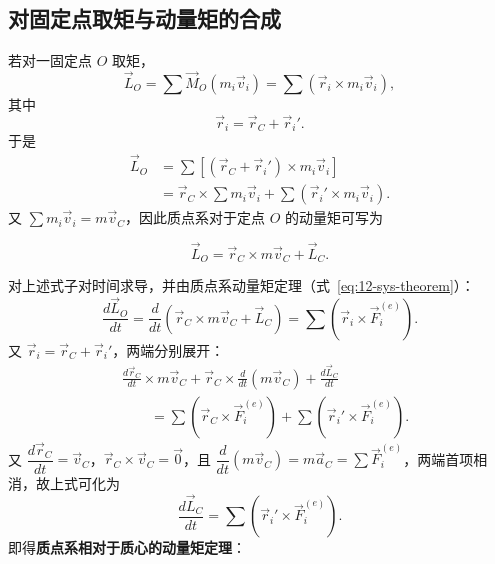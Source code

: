 \subsection{对固定点取矩与动量矩的合成}

若对一固定点 $O$ 取矩，
\begin{equation}\label{eq:12-lo-fixed}
  \vec{L}_O=\sum\vec{M}_O(m_i\vec{v}_i)=\sum\left(\vec{r}_i\times m_i\vec{v}_i\right),
\end{equation}
其中
\begin{equation}\label{eq:12-ri-decomp}
  \vec{r}_i=\vec{r}_C+\vec{r}_i'.
\end{equation}
于是
\begin{equation}\label{eq:12-lo-expand}
\begin{aligned}
  \vec{L}_O
  &=\sum\left[\left(\vec{r}_C+\vec{r}_i'\right)\times m_i\vec{v}_i\right]\\
  &=\vec{r}_C\times\sum m_i\vec{v}_i+\sum\left(\vec{r}_i'\times m_i\vec{v}_i\right).
\end{aligned}
\end{equation}
又 $\sum m_i\vec{v}_i=m\vec{v}_C$，因此质点系对于定点 $O$ 的动量矩可写为

\begin{proposition}[对固定点与对质心动量矩的合成关系]
\begin{equation}\label{eq:12-lo-compose}
  \vec{L}_O=\vec{r}_C\times m\vec{v}_C+\vec{L}_C.
\end{equation}
\end{proposition}


对上述式子对时间求导，并由质点系动量矩定理（式~\eqref{eq:12-sys-theorem}）：
\begin{equation}\label{eq:12-dlo-total}
  \frac{d\vec{L}_O}{dt}
  =\frac{d}{dt}\left(\vec{r}_C\times m\vec{v}_C+\vec{L}_C\right)
  =\sum\left(\vec{r}_i\times\vec{F}_i^{(e)}\right).
\end{equation}
又 $\vec{r}_i=\vec{r}_C+\vec{r}_i'$，两端分别展开：
\begin{equation}\label{eq:12-dlo-expand}
\begin{aligned}
  &\frac{d\vec{r}_C}{dt}\times m\vec{v}_C
   +\vec{r}_C\times\frac{d}{dt}(m\vec{v}_C)
   +\frac{d\vec{L}_C}{dt}\\
  &\qquad=\sum\left(\vec{r}_C\times\vec{F}_i^{(e)}\right)
   +\sum\left(\vec{r}_i'\times\vec{F}_i^{(e)}\right).
\end{aligned}
\end{equation}
又 $\dfrac{d\vec{r}_C}{dt}=\vec{v}_C$，$\vec{r}_C\times\vec{v}_C=\vec{0}$，且 $\dfrac{d}{dt}(m\vec{v}_C)=m\vec{a}_C=\sum\vec{F}_i^{(e)}$，两端首项相消，故上式可化为
\begin{equation}\label{eq:12-dlc-step}
  \frac{d\vec{L}_C}{dt}=\sum\left(\vec{r}_i'\times\vec{F}_i^{(e)}\right).
\end{equation}
即得\textbf{质点系相对于质心的动量矩定理}：

